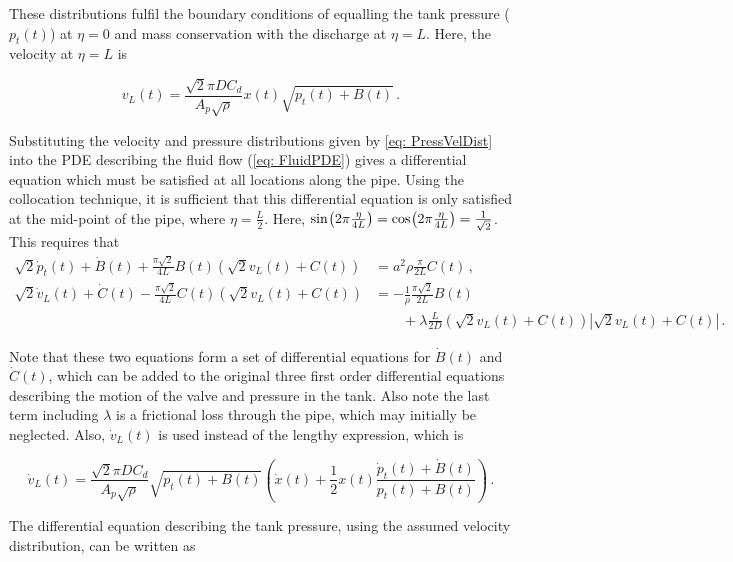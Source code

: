 These distributions fulfil the boundary conditions of equalling the tank pressure ($p_t(t)$) at $\eta = 0$ and mass conservation with the discharge at $\eta = L$. Here, the velocity at $\eta = L$ is

\begin{equation*}
    v_L(t) = \frac{\sqrt{2} \pi D C_d}{A_p \sqrt{\rho}} x(t) \sqrt{p_t(t)+B(t)} \, .
\end{equation*}

Substituting the velocity and pressure distributions given by \cref{eq: PressVelDist} into the PDE describing the fluid flow (\cref{eq: FluidPDE}) gives a differential equation which must be satisfied at all locations along the pipe. Using the collocation technique, it is sufficient that this differential equation is only satisfied at the mid-point of the pipe, where $\eta = \frac{L}{2}$. Here, $\fun{sin}{2 \pi \frac{\eta}{4L}} = \fun{cos}{2 \pi \frac{\eta}{4L}} = \frac{1}{\sqrt{2}}$. This requires that
~
\begin{equation*}
\begin{split}
    \sqrt{2} \dot{p}_t(t) + \dot{B}(t) + \frac{\pi \sqrt{2}}{4 L} B(t) \left( \sqrt{2} v_L(t) + C(t) \right) &= a^2 \rho \frac{\pi}{2L} C(t) \, , \\
    \sqrt{2} \dot{v}_L(t) + \dot{C}(t) - \frac{\pi \sqrt{2}}{4 L} C(t) \left( \sqrt{2} v_L(t) + C(t) \right) &= - \frac{1}{\rho} \frac{\pi \sqrt{2}}{2 L} B(t) \\
    &\qquad + \lambda \frac{L}{2D} \left( \sqrt{2} v_L(t) + C(t) \right) \left| \sqrt{2} v_L(t) + C(t) \right| \, .
\end{split}
\end{equation*}

Note that these two equations form a set of differential equations for $\dot{B}(t)$ and $\dot{C}(t)$, which can be added to the original three first order differential equations describing the motion of the valve and pressure in the tank. Also note the last term including $\lambda$ is a frictional loss through the pipe, which may initially be neglected. Also, $\dot{v}_L(t)$ is used instead of the lengthy expression, which is

\begin{equation*}
    \dot{v}_L(t) = \frac{\sqrt{2} \pi D C_d}{A_p \sqrt{\rho}} \sqrt{p_t(t) + B(t)} \left( \dot{x}(t) + \frac{1}{2} x(t) \frac{\dot{p}_t(t) + \dot{B}(t)}{p_t(t) + B(t)} \right) \, .
\end{equation*}

The differential equation describing the tank pressure, using the assumed velocity distribution, can be written as

